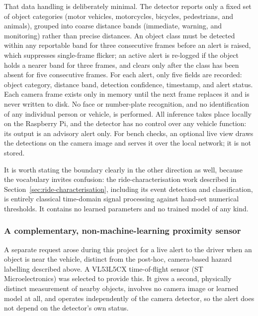 That data handling is deliberately minimal. The detector reports only a fixed set of object categories (motor vehicles, motorcycles, bicycles, pedestrians, and animals), grouped into coarse distance bands (immediate, warning, and monitoring) rather than precise distances. An object class must be detected within any reportable band for three consecutive frames before an alert is raised, which suppresses single-frame flicker; an active alert is re-logged if the object holds a nearer band for three frames, and clears only after the class has been absent for five consecutive frames. For each alert, only five fields are recorded: object category, distance band, detection confidence, timestamp, and alert status. Each camera frame exists only in memory until the next frame replaces it and is never written to disk. No face or number-plate recognition, and no identification of any individual person or vehicle, is performed. All inference takes place locally on the Raspberry Pi, and the detector has no control over any vehicle function: its output is an advisory alert only. For bench checks, an optional live view draws the detections on the camera image and serves it over the local network; it is not stored.

It is worth stating the boundary clearly in the other direction as well, because the vocabulary invites confusion: the ride-characterisation work described in Section~\ref{sec:ride-characterisation}, including its event detection and classification, is entirely classical time-domain signal processing against hand-set numerical thresholds. It contains no learned parameters and no trained model of any kind.

\subsubsection*{A complementary, non-machine-learning proximity sensor}
\label{sec:tof-sensor}

A separate request arose during this project for a live alert to the driver when an object is near the vehicle, distinct from the post-hoc, camera-based hazard labelling described above. A VL53L5CX time-of-flight sensor (ST Microelectronics) was selected to provide this. It gives a second, physically distinct measurement of nearby objects, involves no camera image or learned model at all, and operates independently of the camera detector, so the alert does not depend on the detector's own status.


